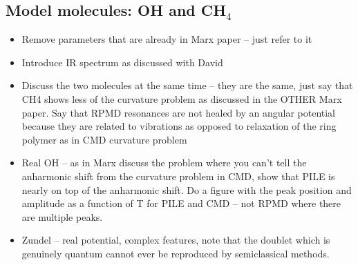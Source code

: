 \documentclass[aps,prb,superscriptaddress,amsmath,amssymb,showpacs,twocolumn]{revtex4}
\begin{document}



\subsection{Model molecules: OH and CH$_4$}

\begin{itemize}
\item Remove parameters that are already in Marx paper -- just refer to it 
\item Introduce IR spectrum as discussed with David 
\item Discuss the two molecules at the same time -- they are the same, just say
that CH4 shows less of the curvature problem as discussed in the OTHER Marx paper.  
Say that RPMD resonances are not healed by an angular potential because they are related
to vibrations as opposed to relaxation of the ring polymer as in CMD curvature problem 
\item Real OH -- as in Marx discuss the problem where you can't tell the anharmonic shift from
the curvature problem in CMD, show that PILE is nearly on top of the anharmonic shift. Do a figure with the peak
position and amplitude as a function of T for PILE and CMD -- not RPMD where there are multiple peaks. 
\item Zundel -- real potential, complex features, note that the doublet which is genuinely quantum 
cannot ever be reproduced by semiclassical methods.
\end{itemize}
\end{document}
